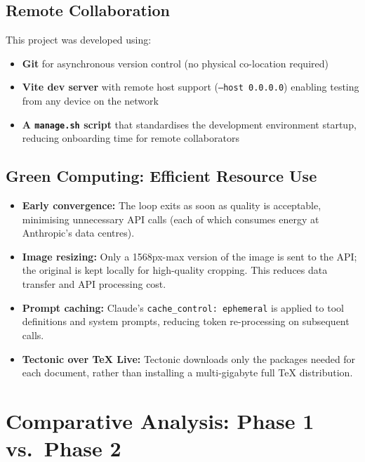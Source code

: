 \documentclass[12pt,a4paper]{article}
\begin{document}
\subsection{Remote Collaboration}
This project was developed using:
\begin{itemize}[noitemsep]
  \item \textbf{Git} for asynchronous version control (no physical co-location required)
  \item \textbf{Vite dev server} with remote host support (\texttt{--host 0.0.0.0}) enabling
    testing from any device on the network
  \item \textbf{A \texttt{manage.sh} script} that standardises the development environment
    startup, reducing onboarding time for remote collaborators
\end{itemize}

\subsection{Green Computing: Efficient Resource Use}
\begin{itemize}[noitemsep]
  \item \textbf{Early convergence:} The loop exits as soon as quality is acceptable, minimising
    unnecessary API calls (each of which consumes energy at Anthropic's data centres).
  \item \textbf{Image resizing:} Only a 1568px-max version of the image is sent to the API;
    the original is kept locally for high-quality cropping. This reduces data transfer and
    API processing cost.
  \item \textbf{Prompt caching:} Claude's \texttt{cache\_control: ephemeral} is applied to
    tool definitions and system prompts, reducing token re-processing on subsequent calls.
  \item \textbf{Tectonic over TeX Live:} Tectonic downloads only the packages needed for each
    document, rather than installing a multi-gigabyte full TeX distribution.
\end{itemize}


\section{Comparative Analysis: Phase 1 vs.\ Phase 2}
\end{document}
